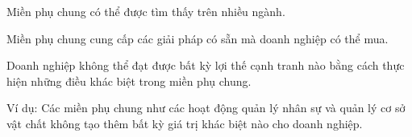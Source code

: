 Miền phụ chung có thể được tìm thấy trên nhiều ngành.

Miền phụ chung cung cấp các giải pháp có sẵn mà doanh nghiệp có thể mua.

Doanh nghiệp không thể đạt được bất kỳ lợi thế cạnh tranh nào bằng cách thực hiện những điều khác biệt trong miền phụ chung.

Ví dụ: Các miền phụ chung như các hoạt động quản lý nhân sự và quản lý cơ sở vật chất không tạo thêm bất kỳ giá trị khác biệt nào cho doanh nghiệp.

